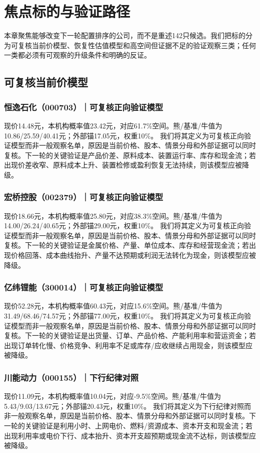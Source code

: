 \chapter{焦点标的与验证路径}

本章聚焦能够改变下一轮配置排序的公司，而不是重述142只候选。我们把标的分为可复核当前价模型、恢复性估值模型和高空间但证据不足的验证观察三类；任何一类都必须有可观察的升级条件和明确的反证。

\section{可复核当前价模型}
\subsection{恒逸石化（000703）｜可复核正向验证模型}
现价14.48元，本机构概率值23.42元，对应61.7\%空间。熊/基准/牛值为10.86/25.59/40.41元；外部锚17.05元，权重10\%。
我们将其定义为可复核正向验证模型而非一般观察名单，原因是当前价格、股本、情景分母和外部证据可以同时复核。下一轮的关键验证是产品价差、原料成本、装置运行率、库存和现金流；若出现价差收窄、原料成本上升、装置检修或盈利恢复无法持续，则该模型应被降级。

\subsection{宏桥控股（002379）｜可复核正向验证模型}
现价18.66元，本机构概率值25.80元，对应38.3\%空间。熊/基准/牛值为14.00/26.24/40.65元；外部锚29.00元，权重10\%。
我们将其定义为可复核正向验证模型而非一般观察名单，原因是当前价格、股本、情景分母和外部证据可以同时复核。下一轮的关键验证是金属价格、产量、单位成本、库存和经营现金流；若出现价格回落、成本曲线抬升、产量不达预期或利润无法转化为现金，则该模型应被降级。

\subsection{亿纬锂能（300014）｜可复核正向验证模型}
现价52.28元，本机构概率值60.43元，对应15.6\%空间。熊/基准/牛值为31.49/68.46/74.57元；外部锚77.00元，权重10\%。
我们将其定义为可复核正向验证模型而非一般观察名单，原因是当前价格、股本、情景分母和外部证据可以同时复核。下一轮的关键验证是出货量、订单、产品价格、产能利用率和营运资金；若出现订单转化慢、价格竞争、利用率不足或库存/应收继续占用现金，则该模型应被降级。

\subsection{川能动力（000155）｜下行纪律对照}
现价11.09元，本机构概率值10.04元，对应-9.5\%空间。熊/基准/牛值为5.43/9.03/13.67元；外部锚20.43元，权重10\%。
我们将其定义为下行纪律对照而非一般观察名单，原因是当前价格、股本、情景分母和外部证据可以同时复核。下一轮的关键验证是利用小时、上网电价、燃料/资源成本、资本开支和现金流；若出现利用率或电价下行、成本抬升、资本开支超预期或现金流不达标，则该模型应被降级。

